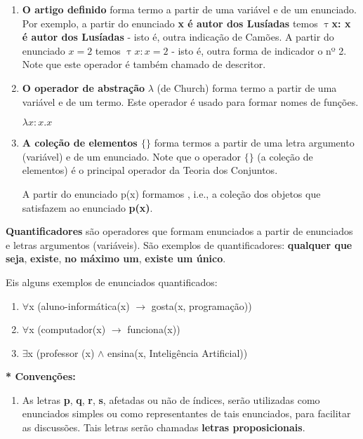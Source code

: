 \begin{enumerate}[label=\arabic*)]
    \begin{enumerate}[label={\textbf{--}}]
        \item \textbf{O artigo definido} forma termo a partir de uma variável e de um enunciado.
        Por exemplo, a partir do enunciado \textbf{x é autor dos Lusíadas} temos \textbf{$\uptau$x: x é autor dos Lusíadas} - isto é, outra indicação de Camões.
        A partir do enunciado \textbf{$x = 2$} temos $\uptau x: x = 2$ - isto é, outra forma de indicador o nº 2.
        Note que este operador é também chamado de descritor.

        \item \textbf{O operador de abstração} $\lambda$ (de Church) forma termo a partir de uma variável e de um termo.
        Este operador é usado para formar nomes de funções.

        \setcounter{exemplo}{0}
        \begin{exemplo}
            $\lambda x: x.x$
        \end{exemplo}

        \item \textbf{A coleção de elementos $\{ \}$} forma termos a partir de uma letra argumento (variável) e de um enunciado.
        Note que o operador $\{ \}$ (a coleção de elementos) é o principal operador da Teoria dos Conjuntos.

        A partir do enunciado p(x) formamos , i.e., a coleção dos objetos que satisfazem ao enunciado \textbf{p(x)}.
    \end{enumerate}

    \textbf{Quantificadores} são operadores que formam enunciados a partir de enunciados e letras argumentos (variáveis).
    São exemplos de quantificadores: \textbf{qualquer que seja}, \textbf{existe}, \textbf{no máximo um}, \textbf{existe um único}.

    Eis alguns exemplos de enunciados quantificados:

    \begin{enumerate}[label=\arabic*)]
        \item $\forall$x (aluno-informática(x) $\to$ gosta(x, programação))
        \item $\forall$x (computador(x) $\to$ funciona(x))
        \item $\exists$x (professor (x) $\land$ ensina(x, Inteligência Artificial))
    \end{enumerate}

    \noindent \textbf{* Convenções:}
    \begin{enumerate}[label=\roman*)]
        \item As letras \textbf{p}, \textbf{q}, \textbf{r}, \textbf{s}, afetadas ou não de índices, serão utilizadas como enunciados simples ou como representantes de tais enunciados, para facilitar as discussões.
        Tais letras serão chamadas \textbf{letras proposicionais}.


\end{enumerate}
\end{enumerate}
